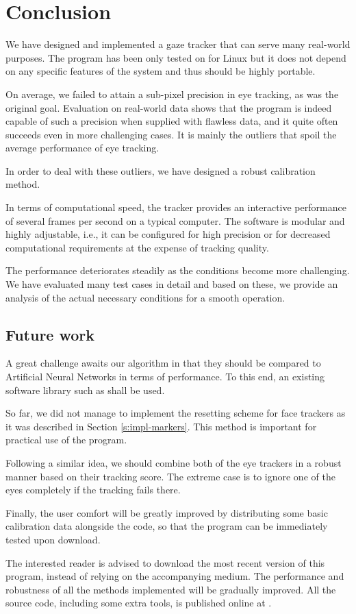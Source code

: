 \chapter*{Conclusion}

We have designed and implemented a gaze tracker that can serve many real-world purposes.
The program has been only tested on for Linux but it does not depend on any specific features of the system and thus should be highly portable.

On average, we failed to attain a sub-pixel precision in eye tracking, as was the original goal.
Evaluation on real-world data shows that  the program is indeed capable of such a precision when supplied with flawless data, and it quite often succeeds even in more challenging cases.
It is mainly the outliers that spoil the average performance of eye tracking.

In order to deal with these outliers, we have designed a robust calibration method.

In terms of computational speed, the tracker provides an interactive performance of several frames per second on a typical computer.
The software is modular and highly adjustable, i.e., it can be configured for high precision or for decreased computational requirements at the expense of tracking quality.

The performance deteriorates steadily as the conditions become more challenging.
We have evaluated many test cases in detail and based on these, we provide an analysis of the actual necessary conditions for a smooth operation.

\section*{Future work}

A great challenge awaits our algorithm in that they should be compared to Artificial Neural Networks in terms of performance.
To this end, an existing software library such as \cite{deepgaze} shall be used.

So far, we did not manage to implement the resetting scheme for face trackers as it was described in Section \ref{s:impl-markers}.
This method is important for practical use of the program.

Following a similar idea, we should combine both of the eye trackers in a robust manner based on their tracking score.
The extreme case is to ignore one of the eyes completely if the tracking fails there.

Finally, the user comfort will be greatly improved by distributing some basic calibration data alongside the code, so that the program can be immediately tested upon download.

The interested reader is advised to download the most recent version of this program, instead of relying on the accompanying medium.
The performance and robustness of all the methods implemented will be gradually improved.
All the source code, including some extra tools, is published online at .
